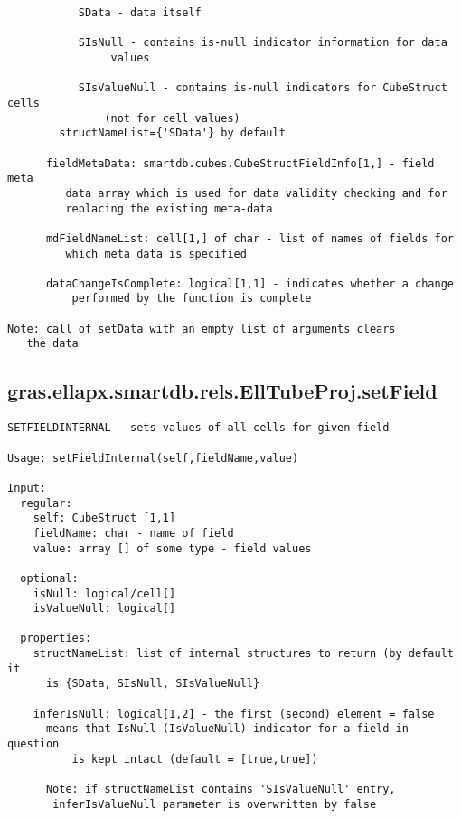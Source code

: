 \begin{verbatim}
           SData - data itself

           SIsNull - contains is-null indicator information for data
                values

           SIsValueNull - contains is-null indicators for CubeStruct cells
               (not for cell values)
        structNameList={'SData'} by default

      fieldMetaData: smartdb.cubes.CubeStructFieldInfo[1,] - field meta
         data array which is used for data validity checking and for
         replacing the existing meta-data

      mdFieldNameList: cell[1,] of char - list of names of fields for
         which meta data is specified

      dataChangeIsComplete: logical[1,1] - indicates whether a change
          performed by the function is complete

Note: call of setData with an empty list of arguments clears
   the data
\end{verbatim}
\subsection{\texorpdfstring{gras.ellapx.smartdb.rels.EllTubeProj.setField}{setField}}\label{method:gras.ellapx.smartdb.rels.EllTubeProj.setField}
\begin{verbatim}
SETFIELDINTERNAL - sets values of all cells for given field

Usage: setFieldInternal(self,fieldName,value)

Input:
  regular:
    self: CubeStruct [1,1]
    fieldName: char - name of field
    value: array [] of some type - field values

  optional:
    isNull: logical/cell[]
    isValueNull: logical[]

  properties:
    structNameList: list of internal structures to return (by default it
      is {SData, SIsNull, SIsValueNull}

    inferIsNull: logical[1,2] - the first (second) element = false
      means that IsNull (IsValueNull) indicator for a field in question
          is kept intact (default = [true,true])

      Note: if structNameList contains 'SIsValueNull' entry,
       inferIsValueNull parameter is overwritten by false
\end{verbatim}

